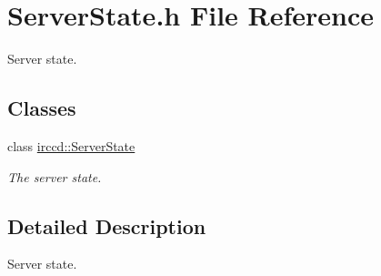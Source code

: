 \hypertarget{a00135}{\section{Server\-State.\-h File Reference}
\label{a00135}
}


Server state.  


\subsection*{Classes}
\begin{DoxyCompactItemize}
\item 
class \hyperlink{a00060}{irccd\-::\-Server\-State}
\begin{DoxyCompactList}\small\item\em The server state. \end{DoxyCompactList}\end{DoxyCompactItemize}


\subsection{Detailed Description}
Server state. 